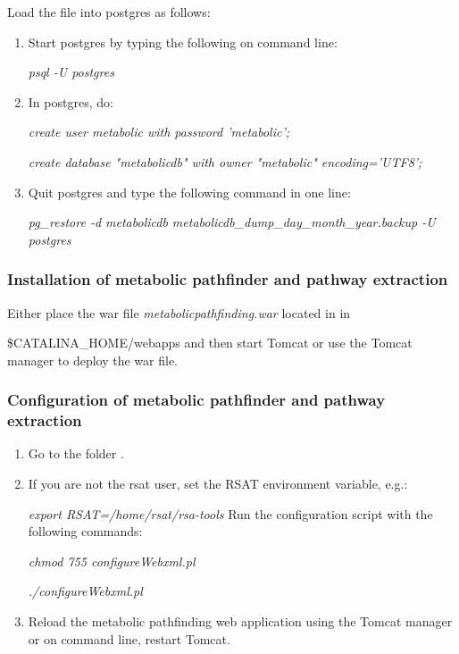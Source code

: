 \documentclass{book}
\begin{document}
\begin{enumerate}
\begin{enumerate}
Load the  file into postgres as follows:
\begin{enumerate}
\item Start postgres by typing the following on command line:

\textit{psql -U postgres}
\item In postgres, do:

\textit{create user metabolic with password 'metabolic';}

\textit{create database "metabolicdb" with owner "metabolic" encoding='UTF8';}
\item Quit postgres and type the following command in one line:

\textit{pg\_restore -d metabolicdb metabolicdb\_dump\_day\_month\_year.backup -U postgres}
\end{enumerate}

\end{enumerate}

\end{enumerate}

\subsubsection{Installation of metabolic pathfinder and pathway extraction}
Either place the war file \textit{metabolicpathfinding.war} located
in  in

\$CATALINA\_HOME/webapps and then start
Tomcat or use the Tomcat manager to deploy the war file.

\subsubsection{Configuration of metabolic pathfinder and pathway extraction}

\begin{enumerate}
\item Go to the folder .

\item If you are not the rsat user, set the RSAT environment variable, e.g.:

      \textit{export RSAT=/home/rsat/rsa-tools}
      Run the configuration script with the following commands:

      \textit{chmod 755 configureWebxml.pl}

      \textit{./configureWebxml.pl}

\item Reload the metabolic pathfinding web application using the Tomcat manager or
      on command line, restart Tomcat.
\end{enumerate}
\end{document}
